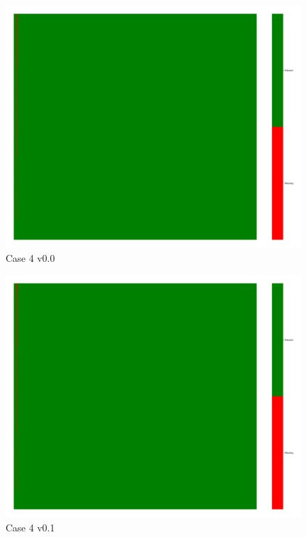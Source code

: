 \documentclass[a4paper,12pt]{article}
\begin{document}
\begin{figure}[H]
    \includegraphics[width=\linewidth]{case4_v0.0_heatmap_cleaned.png}
    \caption*{Case 4 v0.0}
\end{figure}

\begin{figure}[H]
    \includegraphics[width=\linewidth]{case4_v0.1_heatmap_cleaned.png}
    \caption*{Case 4 v0.1}
\end{figure}
\end{document}
